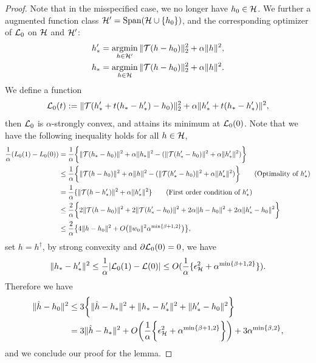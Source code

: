 \begin{proof}
Note that in the misspecified case, we no longer have $h_0\in\mathcal{H}$. We further a augmented function class $\mathcal{H}' = \operatorname{Span}(\mathcal{H} \cup \{h_0\})$, and the corresponding optimizer of $\mathcal{L}_0$ on $\mathcal{H}$ and $\mathcal{H}'$: 
\begin{align*}
&h_*' = \mathop{\mathrm{argmin}}_{h\in\mathcal{H}'}\|{\mathcal{T}}(h - h_0)\|_2^2 + \alpha \|h\|^2,\\
&h_* = \mathop{\mathrm{argmin}}_{h\in\mathcal{H}} \|{\mathcal{T}}(h - h_0)\|_2^2 + \alpha \|h\|^2.
\end{align*}
We define a function $$
\mathcal{L}_0(t):= \|{\mathcal{T}}(h_*' + t(h_* - h_*') - h_0)\|_2^2 + \alpha \|h_*' + t(h_* - h_*')\|^2,
$$
then $\mathcal{L}_0$ is $\alpha$-strongly convex, and attains its minimum at $\mathcal{L}_0(0)$. Note that we have the following inequality holds for all $h\in\mathcal{H}$, \begin{align*}
\frac{1}{\alpha}(L_0(1) - L_0(0))&=\frac{1}{\alpha}\bigg\{ \|{\mathcal{T}}(h_* - h_0)\|^2 + \alpha \|h_*\|^2 - (\|{\mathcal{T}}(h_*' - h_0)\|^2 + \alpha \|h_*'\|^2) \bigg\} \\
&\leq \frac{1}{\alpha}\bigg\{ \|{\mathcal{T}}(h - h_0)\|^2 + \alpha \|h\|^2 - (\|{\mathcal{T}}(h_*' - h_0)\|^2 + \alpha \|h_*'\|^2) \bigg\} \tag{Optimality of $h_*'$}\\
& = \frac{1}{\alpha}\{\|{\mathcal{T}}(h - h_*')\|^2 + \alpha \|h_*'\|^2\} \tag{First order condition of $h_*'$}\\
&\leq \frac{2}{\alpha}\bigg\{    2\|{\mathcal{T}}(h-h_0)\|^2 + 2\|{\mathcal{T}}(h_*'-h_0)\|^2 + 2\alpha\|h-h_0\|^2 + 2\alpha \|h_*' - h_0\|^2\bigg\}\\
&\leq \frac{2}{\alpha}\big\{4\|h-h_0\|^2 + O\big(\|w_0\|^2\alpha^{\min\{\beta+1,2\}}\big)\big\},
\end{align*}
set $h = h^{\dagger}$,  by strong convexity and $\partial\mathcal{L}_0(0) = 0$, we have \begin{align*}
   \|h_* - h_*'\|^2 \leq \frac{1}{\alpha}|\mathcal{L}_0(1) - \mathcal{L}(0)|\leq O(\frac{1}{\alpha}\{\epsilon_{\mathcal{H}}^2 + \alpha^{\min\{\beta+1,2\}}\}).
\end{align*}
Therefore we have \begin{align*}
    \|\hat{h} - h_0\|^2 &\leq 3\bigg\{\|\hat{h} - h_{*}\|^2 + \|h_{*} - h'_{*}\|^2 + \|h_{*}' - h_0\|^2  \bigg\}\\
    &= 3\|\hat{h} - h_{*}\|^2+O\bigg(\frac{1}{\alpha}\bigg\{\epsilon_{\mathcal{H}}^2 + \alpha^{\min\{\beta+1,2\}}\bigg\}\bigg) + 3\alpha^{\min\{\beta,2\}},
\end{align*}
and we conclude our proof for the lemma.
\end{proof}
